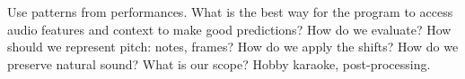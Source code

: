 Use patterns from performances. What is the best way for the program to access audio features and context to make good predictions? How do we evaluate? How should we represent pitch: notes, frames? How do we apply the shifts? How do we preserve natural sound? What is our scope? Hobby karaoke, post-processing.

